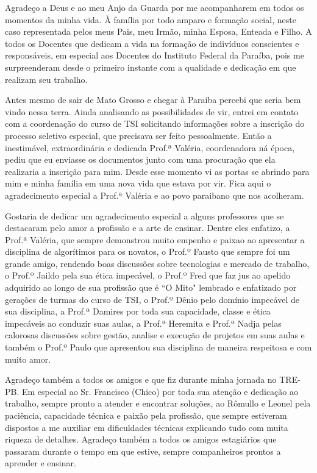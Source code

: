 
\begin{agradecimentos}[AGRADECIMENTOS]

    Agradeço a Deus e ao meu Anjo da Guarda  por me acompanharem em todos os momentos da minha vida. 
    À família por todo amparo e formação social, neste caso representada pelos meus Pais, meu Irmão, minha Esposa, Enteada e Filho. 
    A todos os Docentes que dedicam a vida na formação de indivíduos conscientes e responsáveis, em especial aos Docentes do Instituto Federal da Paraíba, pois me surpreenderam desde o primeiro instante com a qualidade e dedicação em que realizam seu trabalho.

    Antes mesmo de sair de Mato Grosso e chegar à Paraíba percebi que seria bem vindo nessa terra. Ainda analisando as possibilidades de vir, entrei em contato com a coordenação do curso de TSI solicitando informações sobre a inscrição do processo seletivo especial, que precisava ser feito pessoalmente. Então a inestimável, extraordinária e dedicada Prof.ª Valéria, coordenadora ná época, pediu que eu enviasse os documentos junto com uma procuração que ela realizaria a inscrição para mim. Desde esse momento vi as portas se abrindo para mim e minha família em uma nova vida que estava por vir. Fica aqui o agradecimento especial a Prof.ª Valéria e ao povo paraibano que nos acolheram.

    Gostaria de dedicar um agradecimento especial a alguns professores que se destacaram pelo amor a profissão e a arte de ensinar. Dentre eles enfatizo, a Prof.ª Valéria, que sempre demonstrou muito empenho e paixao ao apresentar a disciplina de algorítimos para os novatos, o Prof.º Fausto que sempre foi um grande amigo, rendendo boas discussões sobre tecnologias e mercado de trabalho, o Prof.º Jaildo pela sua ética impecável, o Prof.º Fred que faz jus ao apelido adquirido ao longo de sua profissão que é ``O Mito" \space lembrado e enfatizado por gerações de turmas do curso de TSI, o Prof.º Dênio pelo domínio impecável de sua disciplina, a Prof.ª Damires por toda sua capacidade, classe e ética impecáveis ao conduzir suas aulas, a Prof.ª Heremita e Prof.ª Nadja pelas calorosas discussões sobre gestão, analise e execução de projetos em suas aulas e também o Prof.º Paulo que apresentou sua disciplina de maneira respeitosa e com muito amor.
    
    Agradeço também a todos os amigos e que fiz durante minha jornada no TRE-PB. Em especial ao Sr. Francisco (Chico) por toda sua atenção e dedicação ao trabalho, sempre pronto a atender e encontrar soluções, ao Rômullo e Leonel pela paciência, capacidade técnica e paixão pela profissão, que sempre estiveram dispostos a me auxiliar em dificuldades técnicas explicando tudo com muita riqueza de detalhes. Agradeço também a todos os amigos estagiários que passaram durante o tempo em que estive, sempre companheiros prontos a aprender e ensinar.

\end{agradecimentos}
